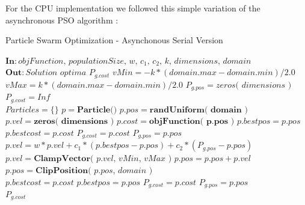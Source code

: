 \documentclass[journal]{IEEEtran}
\begin{document}
For the CPU implementation we followed this simple variation of the asynchronous PSO algorithm :

\begin{algorithm*}
    \caption{Particle Swarm Optimization - Asynchonous Serial Version}\label{alg:PSOcpu}
    \begin{algorithmic}[1]
        \State $\textbf{In}: \textit{objFunction, populationSize, w, $c_{1}$, $c_{2}$, k, dimensions, domain}$
        \State $\textbf{Out}: \textit{Solution optima } P_{g.cost}$
        \State $vMin = -k * ( domain.max - domain.min ) / 2.0$
        \State $vMax =  k * ( domain.max - domain.min ) / 2.0$
        \State $P_{g.pos} = \textit{zeros( dimensions )}$ 
        \State $P_{g.cost} = Inf$ 
        \\
        \State $Particles=\lbrace \rbrace$ 
         
            \State $p = \textbf{Particle()}$
            \State $p.pos = \textbf{randUniform( domain )}$
            \State $p.vel = \textbf{zeros( dimensions )}$
            \State $p.cost = \textbf{objFunction( p.pos )}$
            \State $p.bestpos = p.pos$
            \State $p.bestcost = p.cost$
                \State $P_{g.cost} = p.cost$
                \State $P_{g.pos} = p.pos$
            \EndIf
        \EndFor
        \\
         
                \State $p.vel = w * p.vel + 
                                c_{1} * ( p.bestpos - p.pos ) + 
                                c_{2} * ( P_{g.pos} - p.pos )$ 
                \State $p.vel = \textbf{ClampVector}\textit{( p.vel, vMin, vMax )}$
                \State $p.pos = p.pos + p.vel$ 
                \State $p.pos = \textbf{ClipPosition}\textit{( p.pos, domain )}$
                \\
                    \State $p.bestcost = p.cost$ 
                    \State $p.bestpos = p.pos$
                        \State $P_{g.cost} = p.cost$ 
                        \State $P_{g.pos} = p.pos$
                    \EndIf
                \EndIf
            \EndFor
        \EndWhile
        \\
        \Return $P_{g.cost}$
    \end{algorithmic}
\end{algorithm*}
\end{document}
